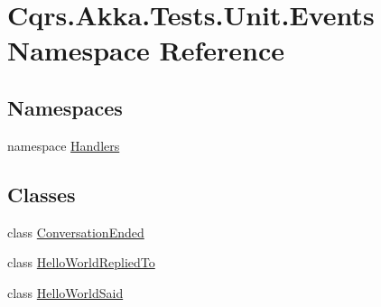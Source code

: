 \hypertarget{namespaceCqrs_1_1Akka_1_1Tests_1_1Unit_1_1Events}{}\section{Cqrs.\+Akka.\+Tests.\+Unit.\+Events Namespace Reference}
\label{namespaceCqrs_1_1Akka_1_1Tests_1_1Unit_1_1Events}
\subsection*{Namespaces}
\begin{DoxyCompactItemize}
\item 
namespace \hyperlink{namespaceCqrs_1_1Akka_1_1Tests_1_1Unit_1_1Events_1_1Handlers}{Handlers}
\end{DoxyCompactItemize}
\subsection*{Classes}
\begin{DoxyCompactItemize}
\item 
class \hyperlink{classCqrs_1_1Akka_1_1Tests_1_1Unit_1_1Events_1_1ConversationEnded}{Conversation\+Ended}
\item 
class \hyperlink{classCqrs_1_1Akka_1_1Tests_1_1Unit_1_1Events_1_1HelloWorldRepliedTo}{Hello\+World\+Replied\+To}
\item 
class \hyperlink{classCqrs_1_1Akka_1_1Tests_1_1Unit_1_1Events_1_1HelloWorldSaid}{Hello\+World\+Said}
\end{DoxyCompactItemize}
